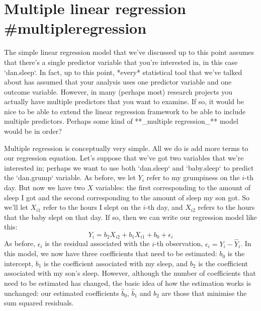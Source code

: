 \section{Multiple linear regression {#multipleregression}}

The simple linear regression model that we've discussed up to this point assumes that there's a single predictor variable that you're interested in, in this case `dan.sleep`. In fact, up to this point, *every* statistical tool that we've talked about has assumed that your analysis uses one predictor variable and one outcome variable. However, in many (perhaps most) research projects you actually have multiple predictors that you want to examine. If so, it would be nice to be able to extend the linear regression framework to be able to include multiple predictors. Perhaps some kind of **_multiple regression_** model would be in order?

Multiple regression is conceptually very simple. All we do is add more terms to our regression equation. Let's suppose that we've got two variables that we're interested in; perhaps we want to use both `dan.sleep` and `baby.sleep` to predict the `dan.grump` variable. As before, we let $Y_i$ refer to my grumpiness on the $i$-th day. But now we have two $X$ variables: the first corresponding to the amount of sleep I got and the second corresponding to the amount of sleep my son got. So we'll let $X_{i1}$ refer to the hours I slept on the $i$-th day, and $X_{i2}$ refers to the hours that the baby slept on that day. If so, then we can write our regression model like this:
$$
Y_i = b_2 X_{i2} + b_1 X_{i1} + b_0 + \epsilon_i
$$
As before, $\epsilon_i$ is the residual associated with the $i$-th observation, $\epsilon_i = {Y}_i - \hat{Y}_i$. In this model, we now have three coefficients that need to be estimated: $b_0$ is the intercept, $b_1$ is the coefficient associated with my sleep, and $b_2$ is the coefficient associated with my son's sleep. However, although the number of coefficients that need to be estimated has changed, the basic idea of how the estimation works is unchanged: our estimated coefficients $\hat{b}_0$, $\hat{b}_1$ and $\hat{b}_2$ are those that minimise the sum squared residuals. 

